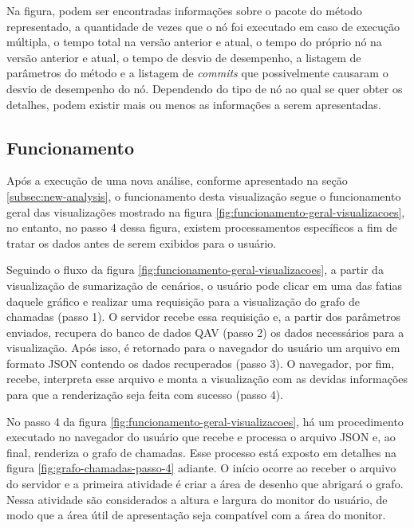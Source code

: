 Na figura, podem ser encontradas informações sobre o pacote do método representado, a quantidade de vezes que o nó foi executado em caso de execução múltipla, o tempo total na versão anterior e atual, o tempo do próprio nó na versão anterior e atual, o tempo de desvio de desempenho, a listagem de parâmetros do método e a listagem de \textit{commits} que possivelmente causaram o desvio de desempenho do nó. Dependendo do tipo de nó ao qual se quer obter os detalhes, podem existir mais ou menos as informações a serem apresentadas.

\FloatBarrier %

\subsection{Funcionamento} \label{subsec:funcionamento-visualizacao-2}

Após a execução de uma nova análise, conforme apresentado na seção \ref{subsec:new-analysis}, o funcionamento desta visualização segue o funcionamento geral das visualizações mostrado na figura \ref{fig:funcionamento-geral-visualizacoes}, no entanto, no passo 4 dessa figura, existem processamentos específicos a fim de tratar os dados antes de serem exibidos para o usuário.

Seguindo o fluxo da figura \ref{fig:funcionamento-geral-visualizacoes}, a partir da visualização de sumarização de cenários, o usuário pode clicar em uma das fatias daquele gráfico e realizar uma requisição para a visualização do grafo de chamadas (passo 1). O servidor recebe essa requisição e, a partir dos parâmetros enviados, recupera do banco de dados QAV (passo 2) os dados necessários para a visualização. Após isso, é retornado para o navegador do usuário um arquivo em formato JSON contendo os dados recuperados (passo 3). O navegador, por fim, recebe, interpreta esse arquivo e monta a visualização com as devidas informações para que a renderização seja feita com sucesso (passo 4).

No passo 4 da figura \ref{fig:funcionamento-geral-visualizacoes}, há um procedimento executado no navegador do usuário que recebe e processa o arquivo JSON e, ao final, renderiza o grafo de chamadas. Esse processo está exposto em detalhes na figura \ref{fig:grafo-chamadas-passo-4} adiante. O início ocorre ao receber o arquivo do servidor e a primeira atividade é criar a área de desenho que abrigará o grafo. Nessa atividade são considerados a altura e largura do monitor do usuário, de modo que a área útil de apresentação seja compatível com a área do monitor.


